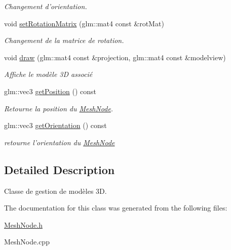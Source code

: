 \begin{DoxyCompactItemize}
\begin{DoxyCompactList}\small\item\em Changement d'orientation. \end{DoxyCompactList}\item 
\hypertarget{classMeshNode_afead0fffba17459bbd07ffb2ff36cd6f}{void \hyperlink{classMeshNode_afead0fffba17459bbd07ffb2ff36cd6f}{set\-Rotation\-Matrix} (glm\-::mat4 const \&rot\-Mat)}\label{classMeshNode_afead0fffba17459bbd07ffb2ff36cd6f}

\begin{DoxyCompactList}\small\item\em Changement de la matrice de rotation. \end{DoxyCompactList}\item 
\hypertarget{classMeshNode_a7b395032fec02d7164791cee62429a37}{void \hyperlink{classMeshNode_a7b395032fec02d7164791cee62429a37}{draw} (glm\-::mat4 const \&projection, glm\-::mat4 const \&modelview)}\label{classMeshNode_a7b395032fec02d7164791cee62429a37}

\begin{DoxyCompactList}\small\item\em Affiche le modèle 3\-D associé \end{DoxyCompactList}\item 
\hypertarget{classMeshNode_a9f798b9773b027539a07d34db4861498}{glm\-::vec3 \hyperlink{classMeshNode_a9f798b9773b027539a07d34db4861498}{get\-Position} () const }\label{classMeshNode_a9f798b9773b027539a07d34db4861498}

\begin{DoxyCompactList}\small\item\em Retourne la position du \hyperlink{classMeshNode}{Mesh\-Node}. \end{DoxyCompactList}\item 
\hypertarget{classMeshNode_afddcbcd339487cf95e0b4078caedbd31}{glm\-::vec3 \hyperlink{classMeshNode_afddcbcd339487cf95e0b4078caedbd31}{get\-Orientation} () const }\label{classMeshNode_afddcbcd339487cf95e0b4078caedbd31}

\begin{DoxyCompactList}\small\item\em retourne l'orientation du \hyperlink{classMeshNode}{Mesh\-Node} \end{DoxyCompactList}\end{DoxyCompactItemize}


\subsection{Detailed Description}
Classe de gestion de modèles 3\-D. 

The documentation for this class was generated from the following files\-:\begin{DoxyCompactItemize}
\item 
\hyperlink{MeshNode_8h}{Mesh\-Node.\-h}\item 
Mesh\-Node.\-cpp\end{DoxyCompactItemize}
